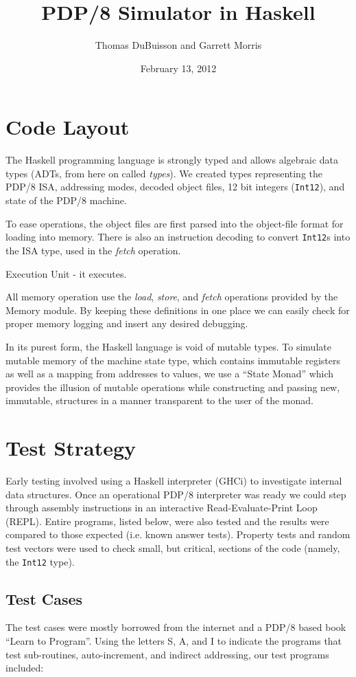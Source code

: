 \documentclass[11pt]{exam}
\title{PDP/8 Simulator in Haskell}
\author{Thomas DuBuisson and Garrett Morris}
\date{February 13, 2012}
\def\Int{\texttt{Int12}}
\begin{document}
\maketitle

\section{Code Layout}
The Haskell programming language is strongly typed and allows
algebraic data types (ADTs, from here on called {\em types}).  We
created types representing the PDP/8 ISA, addressing modes, decoded
object files, 12 bit integers (\Int{}), and state of the PDP/8 machine.

To ease operations, the object files are first parsed into the object-file
format for loading into memory.  There is also an instruction decoding to
convert \Int{}s into the ISA type, used in the {\em fetch} operation.

Execution Unit - it executes.

All memory operation use the {\em load}, {\em store}, and {\em fetch} operations
provided by the Memory module.  By keeping these definitions in one place we can
easily check for proper memory logging and insert any desired debugging.

In its purest form, the Haskell language is void of mutable types.  To
simulate mutable memory of the machine state type, which contains
immutable registers as well as a mapping from addresses to values, we
use a ``State Monad'' which provides the illusion of mutable
operations while constructing and passing new, immutable, structures in
a manner transparent to the user of the monad.

\section{Test Strategy}
Early testing involved using a Haskell interpreter (GHCi) to
investigate internal data structures.  Once an operational PDP/8
interpreter was ready we could step through assembly instructions in
an interactive Read-Evaluate-Print Loop (REPL).  Entire programs,
listed below, were also tested and the results were compared to those
expected (i.e. known answer tests).  Property tests and random test
vectors were used to check small, but critical, sections of the code
(namely, the \Int{} type).

\subsection{Test Cases}
The test cases were mostly borrowed from the internet and a PDP/8
based book ``Learn to Program''.  Using the letters S, A, and I to
indicate the programs that test sub-routines, auto-increment, and
indirect addressing, our test programs included:
\end{document}
